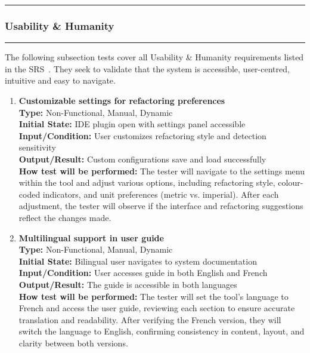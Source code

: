 \documentclass[12pt, titlepage]{article}
\newcommand{\colorrule}{\textcolor{BlueViolet}{\rule{\linewidth}{2pt}}}
\begin{document}
\noindent
\colorrule
    
\subsubsection{Usability \& Humanity}

\colorrule

\medskip

\noindent
The following subsection tests cover all Usability \& Humanity requirements listed in the SRS~\cite{SRS}. They seek to validate that the system is accessible, user-centred, intuitive and easy to navigate.

\begin{enumerate}[label={\bf \textcolor{Maroon}{test-UH-\arabic*}}, wide=0pt, font=\itshape]
  \item \textbf{Customizable settings for refactoring preferences} \\[2mm]
    \textbf{Type:} Non-Functional, Manual, Dynamic \\
    \textbf{Initial State:} IDE plugin open with settings panel accessible \\
    \textbf{Input/Condition:} User customizes refactoring style and detection sensitivity \\
    \textbf{Output/Result:} Custom configurations save and load successfully \\[2mm]
    \textbf{How test will be performed:} The tester will navigate to the settings menu within the tool and adjust various options, including refactoring style, colour-coded indicators, and unit preferences (metric vs. imperial). After each adjustment, the tester will observe if the interface and refactoring suggestions reflect the changes made. 

  \item \textbf{Multilingual support in user guide} \\[2mm]
    \textbf{Type:} Non-Functional, Manual, Dynamic \\ 
    \textbf{Initial State:} Bilingual user navigates to system documentation \\
    \textbf{Input/Condition:} User accesses guide in both English and French \\
    \textbf{Output/Result:} The guide is accessible in both languages \\[2mm]
    \textbf{How test will be performed:} The tester will set the tool’s language to French and access the user guide, reviewing each section to ensure accurate translation and readability. After verifying the French version, they will switch the language to English, confirming consistency in content, layout, and clarity between both versions.


\end{enumerate}
\end{document}
